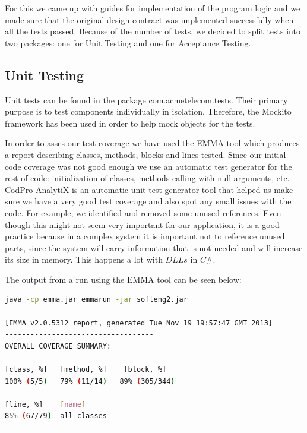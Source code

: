 \documentclass[11pt,twocolumn]{article} %
\begin{document}
For this we came up with guides for implementation of the program logic and we made sure that the original design contract 
was implemented successfully when all the tests passed.            
Because of the number of tests, we decided to split tests into two packages: one for Unit Testing and one for Acceptance Testing.


\subsection{Unit Testing}

Unit tests can be found in the package com.acmetelecom.tests. Their primary purpose is to test components individually in isolation. 
Therefore, the Mockito\cite{mockito} framework has been used in order to help mock objects for the tests.

In order to asses our test coverage we have used the EMMA tool which produces a report describing classes, methods, blocks and lines tested. 
Since our initial code coverage was not good enough we use an automatic test generator for the rest of code: initialization of classes, methods calling with null arguments, etc. 
CodPro AnalytiX\cite{codePro}  is an automatic unit test generator tool that helped us make sure we have a very good test coverage and also spot any small issues with the code. 
For example, we identified and removed some unused references. Even though this might not seem very important for our application, it is a good practice because in a 
complex system it is important not to reference unused parts, since the system will carry information that is not needed and will increase its size in memory. This happens a lot with $DLLs$ in $C\#$. 

The output from a run using the EMMA tool can be seen below:

\begin{lstlisting}[language=bash]
java -cp emma.jar emmarun -jar softeng2.jar

[EMMA v2.0.5312 report, generated Tue Nov 19 19:57:47 GMT 2013]
-----------------------------------
OVERALL COVERAGE SUMMARY:

[class, %]   [method, %]    [block, %]   
100% (5/5)   79% (11/14)   89% (305/344) 

[line, %]    [name]
85% (67/79)  all classes
----------------------------------
\end{lstlisting}
\end{document}
